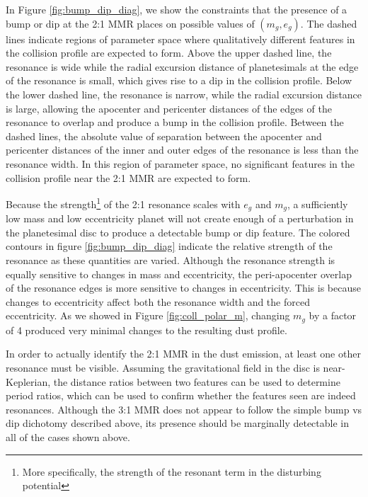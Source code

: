 In Figure \ref{fig:bump_dip_diag}, we show the constraints that the presence of a bump or dip at the 2:1 MMR places on 
possible values of $(m_{g}, e_{g})$. The dashed lines indicate regions of parameter space where qualitatively different features in 
the collision profile are expected to form. Above the upper dashed line, the resonance is wide while the radial excursion distance 
of planetesimals at the edge of the resonance is small, which gives rise to a dip in the collision profile. Below the lower dashed 
line, the resonance is narrow, while the radial excursion distance is large, allowing the apocenter and pericenter distances of the 
edges of the resonance to overlap and produce a bump in the collision profile. Between the dashed lines, the absolute value of 
separation between the apocenter and pericenter distances of the inner and outer edges of the resonance is less than the 
resonance width. In this region of parameter space, no significant features in the collision profile near the 2:1 MMR are expected 
to form. 

Because the strength\footnote{More specifically, the strength of the resonant term in the disturbing potential} of the 2:1 
resonance scales with $e_{g}$ and  $m_{g}$, a sufficiently low mass and low eccentricity planet will not create enough of a 
perturbation in the planetesimal disc to produce a detectable bump or dip feature. The colored contours in figure 
\ref{fig:bump_dip_diag} indicate the relative strength of the resonance as these quantities are varied. Although the resonance 
strength is equally sensitive to changes in mass and eccentricity, the peri-apocenter overlap of the resonance edges is more 
sensitive to changes in eccentricity. This is because changes to eccentricity affect both the resonance width and the forced 
eccentricity. As we showed in Figure \ref{fig:coll_polar_m}, changing $m_{g}$ by a factor of 4 produced very minimal changes to 
the resulting dust profile.

In order to actually identify the 2:1 MMR in the dust emission, at least one other resonance must be visible. Assuming the 
gravitational field in the disc is near-Keplerian, the distance ratios between two features can be used to determine period ratios, 
which can be used to confirm whether the features seen are indeed resonances. Although the 3:1 MMR does not appear to 
follow the simple bump vs dip dichotomy described above, its presence should be marginally detectable in all of the cases 
shown above.

